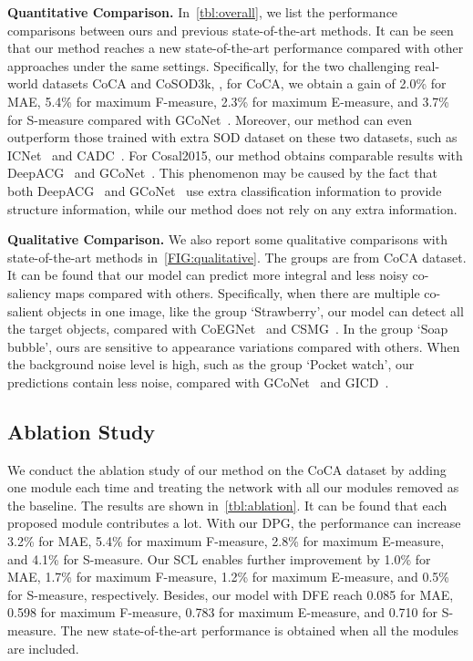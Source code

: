 \documentclass[10pt,twocolumn,letterpaper]{article}
\begin{document}
\textbf{Quantitative Comparison.} In~\cref{tbl:overall}, we list the performance comparisons between ours and previous state-of-the-art methods. It can be seen that our method reaches a new state-of-the-art performance compared with other approaches under the same settings. Specifically, for the two challenging real-world datasets CoCA and CoSOD3k, \eg, for CoCA, we obtain a gain of 2.0\% for MAE, 5.4\% for maximum F-measure, 2.3\% for maximum E-measure, and 3.7\% for S-measure compared with GCoNet~\cite{fan2021group}. Moreover, our method can even outperform those trained with extra SOD dataset on these two datasets, such as ICNet~\cite{jin2020icnet} and CADC~\cite{zhang2021summarize}. 
For Cosal2015, our method obtains comparable results with DeepACG~\cite{zhang2021deepacg} and GCoNet~\cite{fan2021group}. This phenomenon may be caused by the fact that both DeepACG~\cite{zhang2021deepacg} and GCoNet~\cite{fan2021group} use extra classification information to provide structure information, while our method does not rely on any extra information.

\textbf{Qualitative Comparison.} We also report some qualitative comparisons with state-of-the-art methods in~\cref{FIG:qualitative}. The groups are from CoCA dataset. It can be found that our model can predict more integral and less noisy co-saliency maps compared with others. Specifically, when there are multiple co-salient objects in one image, like the group `Strawberry', our model can detect all the target objects,  compared with CoEGNet~\cite{deng2021re} and CSMG~\cite{zhang2019co}. In the group `Soap bubble', ours are sensitive to appearance variations compared with others. When the background noise level is high, such as the group `Pocket watch', our predictions contain less noise, compared with GCoNet~\cite{fan2021group} and GICD~\cite{zhang2020gradient}.

\subsection{Ablation Study}

We conduct the ablation study of our method on the CoCA dataset by adding one module each time and treating the network with all our modules removed as the baseline. The results are shown in~\cref{tbl:ablation}. It can be found that each proposed module contributes a lot. With our DPG, the performance can increase 3.2\% for MAE, 5.4\% for maximum F-measure, 2.8\% for maximum E-measure, and 4.1\% for S-measure. Our SCL enables further improvement by 1.0\% for MAE, 1.7\% for maximum F-measure, 1.2\% for maximum E-measure, and 0.5\% for S-measure, respectively. Besides, our model with DFE reach 0.085 for MAE, 0.598 for maximum F-measure, 0.783 for maximum E-measure, and 0.710 for S-measure. The new state-of-the-art performance is obtained when all the modules are included.
\end{document}

